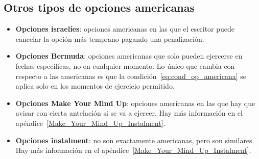 \subsection{Otros tipos de opciones americanas}
\begin{itemize}
    \item \textbf{Opciones israelíes}: opciones americanas en las que el escritor puede cancelar la opción más temprano pagando una penalización.
    \item \textbf{Opciones Bermuda}: opciones americanas que solo pueden ejercerse en fechas específicas, no en cualquier momento. Lo único que cambia con respecto a las americanas es que la condición~\eqref{eq:cond_op_americana} se aplica solo en los momentos de ejercicio permitido.
    \item \textbf{Opciones Make Your Mind Up}: opciones americanas en las que hay que avisar con cierta antelación si se va a ejercer. Hay más información en el apéndice~\ref{Make_Your_Mind_Up_Instalment}.
    \item \textbf{Opciones instalment}: no son exactamente americanas, pero son similares. Hay más información en el apéndice~\ref{Make_Your_Mind_Up_Instalment}.
\end{itemize}









